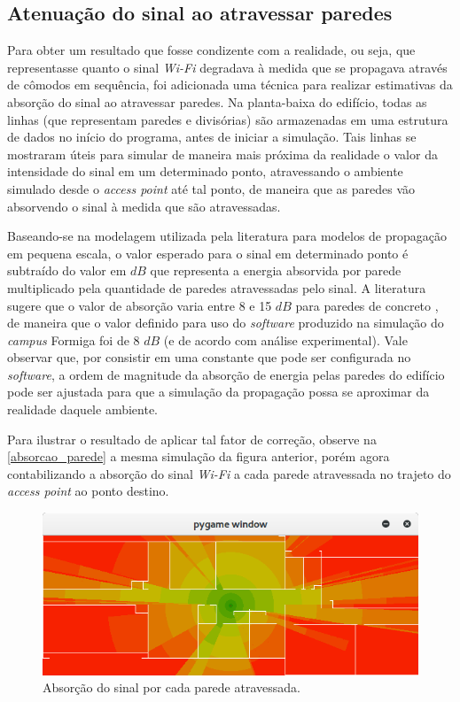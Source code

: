 \documentclass[
	12pt,				%
	twoside,			%
	a4paper,			%
	english,			%
	french,				%
	spanish,			%
	brazil				%
	]{abntex2}
\begin{document}
\subsection{Atenuação do sinal ao atravessar
paredes}\label{atenuauxe7uxe3o-do-sinal-ao-atravessar-paredes}

Para obter um resultado que fosse condizente com a realidade, ou seja,
que representasse quanto o sinal \emph{Wi-Fi} degradava à medida que se
propagava através de cômodos em sequência, foi adicionada uma técnica
para realizar estimativas da absorção do sinal ao atravessar paredes. Na
planta-baixa do edifício, todas as linhas (que representam paredes e
divisórias) são armazenadas em uma estrutura de dados no início do
programa, antes de iniciar a simulação. Tais linhas se mostraram úteis
para simular de maneira mais próxima da realidade o valor da intensidade
do sinal em um determinado ponto, atravessando o ambiente simulado desde
o \emph{access point} até tal ponto, de maneira que as paredes vão
absorvendo o sinal à medida que são atravessadas.

Baseando-se na modelagem utilizada pela literatura para modelos de
propagação em pequena escala, o valor esperado para o sinal em
determinado ponto é subtraído do valor em \(dB\) que representa a
energia absorvida por parede multiplicado pela quantidade de paredes
atravessadas pelo sinal. A literatura sugere que o valor de absorção
varia entre 8 e 15 \(dB\) para paredes de concreto \cite{RAPPAPORT}, de
maneira que o valor definido para uso do \emph{software} produzido na
simulação do \emph{campus} Formiga foi de 8 \(dB\) (e de acordo com
análise experimental). Vale observar que, por consistir em uma constante
que pode ser configurada no \emph{software}, a ordem de magnitude da
absorção de energia pelas paredes do edifício pode ser ajustada para que
a simulação da propagação possa se aproximar da realidade daquele
ambiente.

Para ilustrar o resultado de aplicar tal fator de correção, observe na
\autoref{absorcao_parede} a mesma simulação da figura anterior, porém
agora contabilizando a absorção do sinal \emph{Wi-Fi} a cada parede
atravessada no trajeto do \emph{access point} ao ponto destino.

\begin{figure}[ht]
    \caption{\label{absorcao_parede} Absorção do sinal por cada parede atravessada.}
    \begin{center}
        \includegraphics[scale=0.7]{imagens/absorcao-parede.jpg}
    \end{center}
\end{figure}
\end{document}
